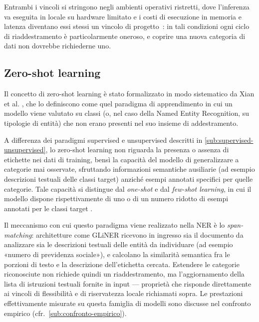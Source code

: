 Entrambi i vincoli si stringono negli ambienti operativi ristretti, dove l'inferenza va eseguita in locale su hardware limitato e i costi di esecuzione in memoria e latenza diventano essi stessi un vincolo di progetto~\cite{lu2024slmsurvey}: in tali condizioni ogni ciclo di riaddestramento è particolarmente oneroso, e coprire una nuova categoria di dati non dovrebbe richiederne uno.


\subsection{Zero-shot learning}
\label{sub:zero-shot}
Il concetto di zero-shot learning è stato formalizzato in modo sistematico da Xian et al. \cite{xianZeroShotLearningComprehensive2020}, che lo definiscono come quel paradigma di apprendimento in cui un modello viene valutato su classi (o, nel caso della Named Entity Recognition, su tipologie di entità) che non erano presenti nel suo insieme di addestramento.

A differenza dei paradigmi supervised e unsupervised descritti in \ref{sub:supervised-unsupervised}, lo zero-shot learning non riguarda la presenza o assenza di etichette nei dati di training, bensì la capacità del modello di generalizzare a categorie mai osservate, sfruttando informazioni semantiche ausiliarie (ad esempio descrizioni testuali delle classi target) anziché esempi annotati specifici per quelle categorie. Tale capacità si distingue dal \textit{one-shot} e dal \textit{few-shot learning}, in cui il modello dispone rispettivamente di uno o di un numero ridotto di esempi annotati per le classi target \cite{brownLanguageModelsAre2020}. \medskip

Il meccanismo con cui questo paradigma viene realizzato nella NER è lo \textit{span-matching}: architetture come GLiNER \cite{zaratianaGLiNERGeneralistModel2024} ricevono in ingresso sia il documento da analizzare sia le descrizioni testuali delle entità da individuare (ad esempio «numero di previdenza sociale»), e calcolano la similarità semantica fra le porzioni di testo e la descrizione dell'etichetta cercata. Estendere le categorie riconosciute non richiede quindi un riaddestramento, ma l'aggiornamento della lista di istruzioni testuali fornite in input --- proprietà che risponde direttamente ai vincoli di flessibilità e di riservatezza locale richiamati sopra. Le prestazioni effettivamente misurate su questa famiglia di modelli sono discusse nel confronto empirico (cfr.~\ref{sub:confronto-empirico}).

